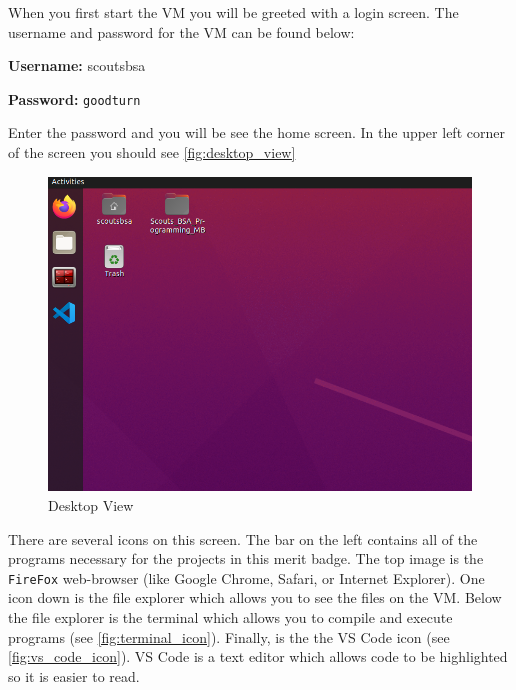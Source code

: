     When you first start the VM you will be greeted with a login screen.
    The username and password for the VM can be found below:


    \vspace{5pt}
    \begin{mdframed}[]
      \textbf{Username:} scoutsbsa

      \textbf{Password:} \texttt{goodturn} 
    \end{mdframed}

    Enter the password and you will be see the home screen.
    In the upper left corner of the screen you should see \autoref{fig:desktop_view}

    \begin{figure}[ht]
      \centering
      \includegraphics[width=0.8\linewidth]{./images/desktop.png}
      \caption{Desktop View}
      \label{fig:desktop_view}
    \end{figure}

    \FloatBarrier

    There are several icons on this screen.
    The bar on the left contains all of the programs necessary for the projects in this merit badge.
    The top image is the \texttt{FireFox} web-browser (like Google Chrome, Safari, or Internet Explorer).
    One icon down is the file explorer which allows you to see the files on the VM.
    Below the file explorer is the terminal which allows you to compile and execute programs (see \autoref{fig:terminal_icon}).
    Finally, is the the VS Code icon (see \autoref{fig:vs_code_icon}).
    VS Code is a text editor which allows code to be highlighted so it is easier to read.

